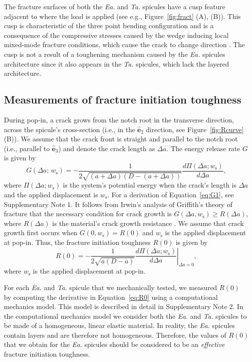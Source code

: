 \documentclass[12pt,onecolumn]{article}
\makeatletter
\newcommand{\ey}{\hat{\mathbf{e}}_2}
\newcommand{\ez}{\hat{\mathbf{e}}_3}
\newcommand{\TA}{\textit{Ta.\@}\xspace}
\newcommand{\EA}{\textit{Ea.\@}\xspace}
\makeatother
\begin{document}
\begin{bibunit}
The fracture surfaces of both the \EA and \TA spicules have a cusp feature adjacent to where the load is applied (see e.g., Figure~\ref{fig:fract} (A), (B)). This cusp is characteristic of the three point bending configuration \cite{quinn2007fractography} and is a consequence of the compressive stresses caused by the wedge inducing local mixed-mode fracture conditions, which cause the crack to change direction \cite{anderson2017fracture}. The cusp is not a result of a toughening mechanism caused by the \EA spicules architecture since it also appears in the \TA spicules, which lack the layered architecture.


\subsection*{Measurements of fracture initiation toughness}
\label{sec:Gc}
During pop-in, a crack grows from the notch root in the transverse direction, across the spicule's cross-section (i.e., in the $\ey$ direction, see Figure~\ref{fig:Rcurve} (B)). We assume that the crack front is straight and parallel to the notch root (i.e., parallel to $\ez$) and denote the crack length as $\Delta a$. The energy release rate $G$ is given by
%
\begin{equation}
    \label{eq:G1}
    G(\Delta a;\,w_\mathrm{s})=-\frac{1}{2\sqrt{(a+\Delta a)(D-(a+\Delta a))}}\frac{d\Pi(\Delta a; w_\mathrm{s})}{d\Delta a },
\end{equation}
%
where $\Pi(\Delta a;w_\mathrm{s})$ is the system's potential energy when the crack's length is $\Delta a$ and the applied displacement is $w_\mathrm{s}$. For a derivation of Equation~\eqref{eq:G1}, see Supplementary Note 1. It follows from Irwin's analysis of Griffith's theory of fracture that the necessary condition for crack growth is $G(\Delta a,w_\mathrm{s})\geq R(\Delta a)$, where $R(\Delta a)$ is the material's crack growth resistance \cite{anderson2017fracture}. We assume that crack growth first occurs when $G(0,w_\mathrm{s})=R(0)$ and $w_\mathrm{s}$ is the applied displacement at pop-in. Thus, the fracture initiation toughness $R(0)$ is given by
%
\begin{equation}
    \label{eq:R0}
    R(0)=-\frac{1}{2\sqrt{a(D-a)}} \left.\frac{d\Pi(\Delta a; w_\mathrm{s})}{d\Delta a }\right\vert_{\Delta a=0},
\end{equation}
%
where $w_\mathrm{s}$ is the applied displacement at pop-in.

For each \EA and \TA spicule that we mechanically tested, we measured $R(0)$ by computing the derivative in Equation~\eqref{eq:R0} using a computational mechanics model. This model is described in detail in Supplementary Note 2. In the computational mechanics model we consider both the \EA and \TA spicules to be made of a homogeneous, linear elastic material. In reality, the \EA spicules contain layers and are therefore not homogeneous. Therefore, the values of $R(0)$ that we obtain for the \EA spicules should be considered to be an \emph{effective} fracture initiation toughness.


\end{bibunit}
\end{document}
